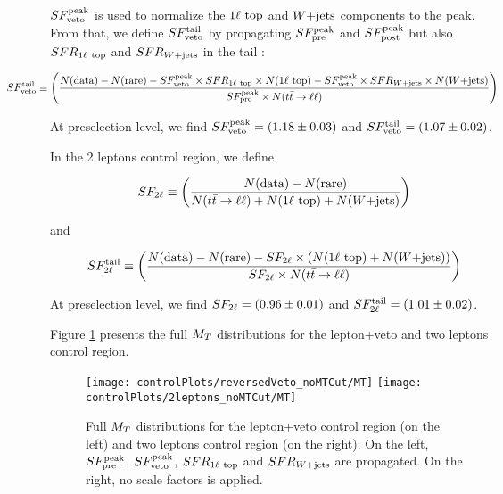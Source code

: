         $SF_{\text{veto}}^{\text{peak}}$ is used to normalize the $1\ell~\text{top}$ and $\text{$W$+jets}$ components to the peak. From that, we define $SF_{\text{veto}}^{\text{tail}}$ by propagating $SF_{\text{pre}}^{\text{peak}}$ and $SF_{\text{post}}^{\text{peak}}$ but also $SFR_{1\ell~\text{top}}$ and $SFR_{\text{$W$+jets}}$ in the tail :

        \begin{equation}
            \hspace*{-1.5cm}
            \SFvetoTail \definedAs \left( \frac{N(\text{data}) - N(\text{rare}) - \SFveto \times \SFRoneLeptonTop \times N(\oneLeptonTop) - \SFveto \times \SFRWjets \times N(\Wjets)}{ \SFpre \times  N(\diLeptonTop)} \right)
        \end{equation}

        At preselection level, we find $SF_{\text{veto}}^{\text{peak}} = (1.18 \pm 0.03)$ and $SF_{\text{veto}}^{\text{tail}} = (1.07 \pm 0.02)$.

        In the 2 leptons control region, we define

        \begin{equation}
            SF_{2\ell} \equiv \left( \frac{N(\text{data}) - N(\text{rare})}{N(t\bar{t} \rightarrow \ell \ell) + N(1\ell~\text{top}) + N(\text{$W$+jets})} \right)
        \end{equation}

        and 

        \begin{equation}
            SF_{2\ell}^{\text{tail}} \equiv \left( \frac{N(\text{data}) - N(\text{rare}) - SF_{2\ell} \times (N(1\ell~\text{top}) + N(\text{$W$+jets}))}{SF_{2\ell} \times N(t\bar{t} \rightarrow \ell \ell)} \right)
        \end{equation}

        At preselection level, we find $SF_{2\ell} = (0.96 \pm 0.01)$ and $SF_{2\ell}^{\text{tail}} = (1.01 \pm 0.02)$.

        Figure \ref{fig:preselMT2leptonAndLepPlusVeto} presents the full $M_T$ distributions for the lepton+veto and two leptons control region.

        \begin{figure}[h!]
            \centering
            \texttt{[image: controlPlots/reversedVeto\_noMTCut/MT]}
            \texttt{[image: controlPlots/2leptons\_noMTCut/MT]}
            \caption{Full $M_T$ distributions for the lepton+veto control region (on the left) and two leptons control region (on the right). On the left, $SF_{\text{pre}}^{\text{peak}}$, $SF_{\text{veto}}^{\text{peak}}$, $SFR_{1\ell~\text{top}}$ and $SFR_{\text{$W$+jets}}$ are propagated. On the right, no scale factors is applied.}
                    \label{fig:preselMT2leptonAndLepPlusVeto}
        \end{figure}

